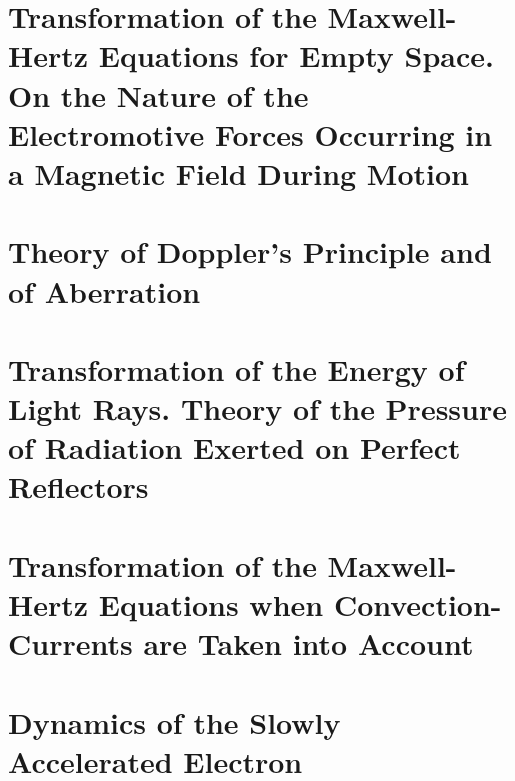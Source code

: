 \section{Transformation of the Maxwell-Hertz Equations for Empty Space. On the Nature of the Electromotive Forces Occurring in a Magnetic Field During Motion}




\section{Theory of Doppler's Principle and of Aberration}




\section{Transformation of the Energy of Light Rays. Theory of the Pressure of Radiation Exerted on Perfect Reflectors}




\section{Transformation of the Maxwell-Hertz Equations when Convection-Currents are Taken into Account}




\section{Dynamics of the Slowly Accelerated Electron}

